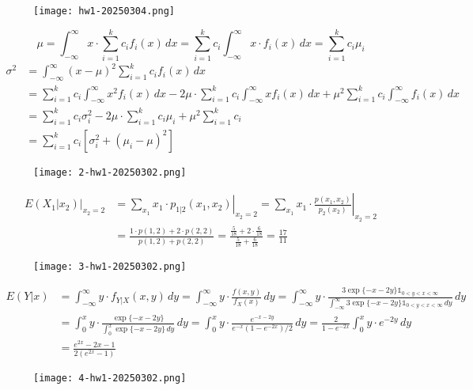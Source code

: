 \begin{figure}[H]
\centering
\texttt{[image: hw1-20250304.png]}
\label{}
\end{figure}
\[
\mu=\int_{-\infty}^{\infty} x\cdot\sum_{i=1}^{k} c_if_i(x) \, dx =\sum_{i=1}^{k} c_i\int_{-\infty}^{\infty} x\cdot f_i(x) \, dx =\sum_{i=1}^{k} c_{i}\mu _i
\]
\[
\begin{aligned}
\sigma^{2} & =\int_{-\infty}^{\infty} (x-\mu)^{2} \sum_{i=1}^{k} c_if_i(x)\, dx  \\
 & =\sum_{i=1}^{k} c_i\int_{-\infty}^{\infty} x^{2}f_i(x) \, dx -2\mu \cdot \sum_{i=1}^{k}  c_i\int_{-\infty}^{\infty} xf_i(x) \, dx +\mu^{2} \sum_{i=1}^{k} c_i\int_{-\infty}^{\infty} f_i(x) \, dx  \\
 & =\sum_{i=1}^{k} c_i\sigma _i^{2}-2\mu \cdot \sum_{i=1}^{k} c_i \mu _i +\mu^{2}\sum_{i=1}^{k} c_i \\
 & =\sum_{i=1}^{k} c_i[\sigma _i^{2}+(\mu _i-\mu)^{2}] 
\end{aligned}
\]
\begin{figure}[H]
\centering
\texttt{[image: 2-hw1-20250302.png]}
\label{}
\end{figure}
\[
\begin{aligned}
\left.E(X_{1}|x_{2})\right|_{x_{2}=2} & =\sum_{x_{1}}x_{1}\cdot \left.p_{1|2}(x_{1},x_{2})\right|_{x_{2}=2}=\sum_{x_{1}}x_{1}\cdot \left.\frac{p(x_1,x_2)}{p_2(x_2)}\right|_{x_{2}=2} \\
 & =\frac{1\cdot p(1,2)+2\cdot p(2,2)}{p(1,2)+p(2,2)}=\frac{\frac{5}{18}+2\cdot\frac{6}{18}  }{\frac{5}{18}+\frac{6}{18}  }=\frac{17}{11} 
\end{aligned}
\]
\begin{figure}[H]
\centering
\texttt{[image: 3-hw1-20250302.png]}
\label{}
\end{figure}
\[
\begin{aligned}
E(Y|x) & =\int_{-\infty}^{\infty} y\cdot f_{Y|X}(x,y) \, dy =\int_{-\infty}^{\infty} y\cdot\frac{f(x,y)}{f_{X}(x)} \, dy=\int_{-\infty}^{\infty} y\cdot\frac{3\exp \{ -x-2y \}\mathbb{1}_{0<y<x<\infty}}{\int_{-\infty}^{\infty} 3\exp \{ -x-2y \}\mathbb{1}_{0<y<x<\infty} \, dy } \, dy  \\
 & =\int_{0}^{x} y\cdot\frac{\exp \{ -x-2y \}}{\int_{0}^{x} \exp \{ -x-2y \} \, dy } \, dy=\int_{0}^{x} y \cdot\frac{e^{ -x-2y }}{e^{ -x }(1-e^{ -2x })/2}\, dy=\frac{2}{1-e^{ -2x }}\int_{0}^{x} y\cdot e^{ -2y } \, dy  \\
 & =\frac{e^{ 2x }-2x-1}{2(e^{ 2x }-1)} \end{aligned} 
\]
\begin{figure}[H]
\centering
\texttt{[image: 4-hw1-20250302.png]}
\label{}
\end{figure}

